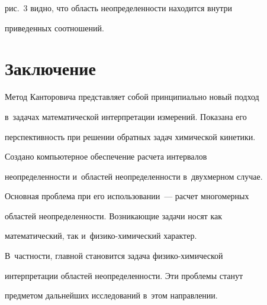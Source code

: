 рис.~3 видно, что область неопределенности находится внутри 

приведенных соотношений.

  

  \section{Заключение}

  




  

  Метод Канторовича пред\-став\-ля\-ет собой принципиально новый подход 

в~задачах математической интерпретации измерений. Показана его 

перспективность при решении обратных задач химической кинетики. 

  

  Создано компьютерное обеспечение расчета интервалов 

неопределенности и~областей неопределенности в~двухмерном случае. 

  

  Основная проблема при его использовании~--- расчет многомерных 

областей неопределенности. Возникающие задачи носят как 

математический, так и~фи\-зи\-ко-хи\-ми\-че\-ский характер.  

В~част\-ности, главной становится задача фи\-зи\-ко-хи\-ми\-че\-ской 

интерпретации областей неопределенности. Эти проблемы станут 

пред\-ме\-том дальнейших исследований в~этом направлении.




  

